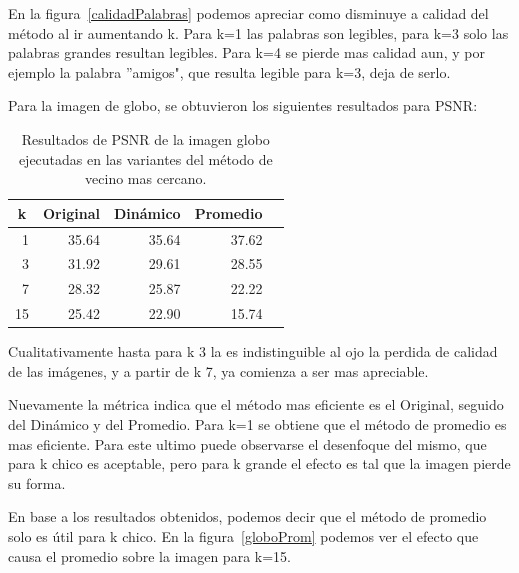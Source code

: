 \documentclass[a4paper]{article}
\newcounter{col}
\begin{document}
En la figura~\ref{calidadPalabras} podemos apreciar como disminuye a calidad del método al ir aumentando k. Para k=1 las palabras son legibles, para k=3 solo las palabras grandes resultan legibles. Para k=4 se pierde mas calidad aun, y por ejemplo la palabra ''amigos", que resulta legible para k=3, deja de serlo.


Para la imagen de globo, se obtuvieron los siguientes resultados para PSNR:


\begin{table}[H]
\centering
\begin{tabular}{|r|r|r|r|r|}
\hline
\multicolumn{1}{|c|}{k} & \multicolumn{1}{c|}{Original} & \multicolumn{1}{c|}{Dinámico} & \multicolumn{1}{c|}{Promedio} \\ \hline
1 & 35.64 & 35.64& 37.62 \\ \hline
3 & 31.92 &  29.61 & 28.55 \\ \hline
7 & 28.32 &  25.87 & 22.22 \\ \hline
15 &25.42&  22.90 & 15.74 \\ \hline
\end{tabular}
\caption{Resultados de PSNR de la imagen globo ejecutadas en las variantes del m\'etodo de vecino mas cercano.}
\label{}
\end{table}

Cualitativamente hasta para k 3 la es indistinguible al ojo la perdida de calidad de las imágenes, y a partir de k 7, ya comienza a ser mas apreciable.

Nuevamente la métrica indica que el método mas eficiente es el Original, seguido del Dinámico y del Promedio. Para k=1 se obtiene que el método de promedio es mas eficiente. Para este ultimo puede observarse el desenfoque del mismo, que para k chico es aceptable, pero para k grande el efecto es tal que la imagen pierde su forma.

En base a los resultados obtenidos, podemos decir que el método de promedio solo es útil para k chico. En la figura~\ref{globoProm} podemos ver el efecto que causa el promedio sobre la imagen para k=15.
\end{document}
